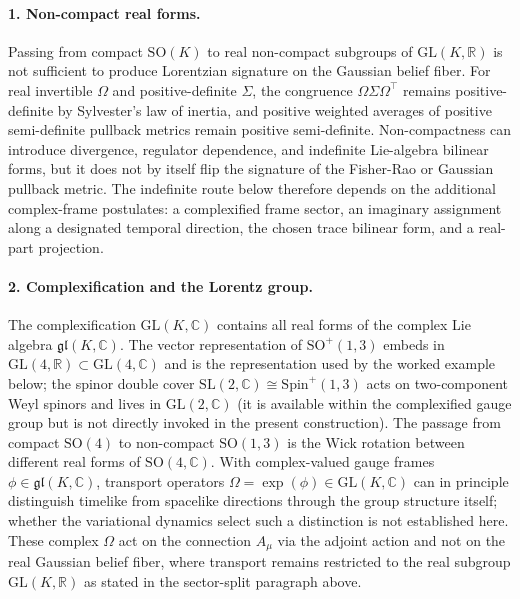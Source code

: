 \documentclass[11pt]{article}
\begin{document}
\paragraph{1. Non-compact real forms.} Passing from compact $\mathrm{SO}(K)$ to real non-compact subgroups of $\mathrm{GL}(K,\mathbb{R})$ is not sufficient to produce Lorentzian signature on the Gaussian belief fiber. For real invertible $\Omega$ and positive-definite $\Sigma$, the congruence $\Omega\Sigma\Omega^\top$ remains positive-definite by Sylvester's law of inertia, and positive weighted averages of positive semi-definite pullback metrics remain positive semi-definite. Non-compactness can introduce divergence, regulator dependence, and indefinite Lie-algebra bilinear forms, but it does not by itself flip the signature of the Fisher-Rao or Gaussian pullback metric. The indefinite route below therefore depends on the additional complex-frame postulates: a complexified frame sector, an imaginary assignment along a designated temporal direction, the chosen trace bilinear form, and a real-part projection.

\paragraph{2. Complexification and the Lorentz group.} The complexification $\mathrm{GL}(K, \mathbb{C})$ contains all real forms of the complex Lie algebra $\mathfrak{gl}(K, \mathbb{C})$. The vector representation of $\mathrm{SO}^+(1,3)$ embeds in $\mathrm{GL}(4,\mathbb{R}) \subset \mathrm{GL}(4,\mathbb{C})$ and is the representation used by the worked example below; the spinor double cover $\mathrm{SL}(2,\mathbb{C}) \cong \mathrm{Spin}^+(1,3)$ acts on two-component Weyl spinors and lives in $\mathrm{GL}(2,\mathbb{C})$ (it is available within the complexified gauge group but is not directly invoked in the present construction). The passage from compact $\mathrm{SO}(4)$ to non-compact $\mathrm{SO}(1,3)$ is the Wick rotation between different real forms of $\mathrm{SO}(4, \mathbb{C})$. With complex-valued gauge frames $\phi \in \mathfrak{gl}(K, \mathbb{C})$, transport operators $\Omega = \exp(\phi) \in \mathrm{GL}(K, \mathbb{C})$ can in principle distinguish timelike from spacelike directions through the group structure itself; whether the variational dynamics select such a distinction is not established here. These complex $\Omega$ act on the connection $A_\mu$ via the adjoint action and not on the real Gaussian belief fiber, where transport remains restricted to the real subgroup $\mathrm{GL}(K, \mathbb{R})$ as stated in the sector-split paragraph above.
\end{document}
